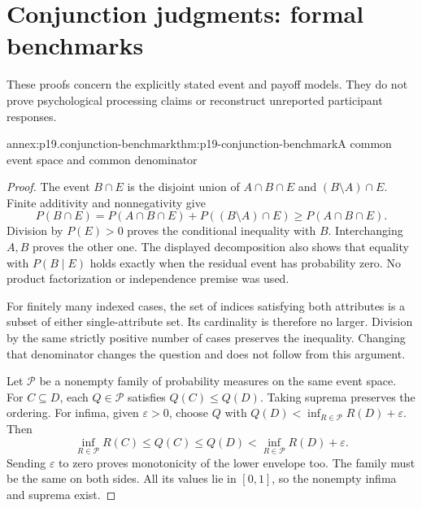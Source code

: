 \section{Conjunction judgments: formal benchmarks}
\label{sec:annex-p19-conjunction-judgments}

These proofs concern the explicitly stated event and payoff models.
They do not prove psychological processing claims or reconstruct
unreported participant responses.

\begin{annexitem}{annex:p19.conjunction-benchmark}{thm:p19-conjunction-benchmark}{A common event space and common denominator}
\begin{proof}
The event \(B\cap E\) is the disjoint union of
\(A\cap B\cap E\) and \((B\setminus A)\cap E\).
Finite additivity and nonnegativity give
\[
 P(B\cap E)=P(A\cap B\cap E)+P((B\setminus A)\cap E)
                         \geq P(A\cap B\cap E).
\]
Division by \(P(E)>0\) proves the conditional inequality
with \(B\). Interchanging \(A,B\) proves the other one.
The displayed decomposition also shows that equality
with \(P(B\mid E)\) holds exactly when the residual
event has probability zero. No product factorization
or independence premise was used.

For finitely many indexed cases, the set of indices
satisfying both attributes is a subset of either
single-attribute set. Its cardinality is therefore
no larger. Division by the same strictly positive
number of cases preserves the inequality. Changing
that denominator changes the question and does not
follow from this argument.

Let \(\mathcal P\) be a nonempty family of probability
measures on the same event space. For \(C\subseteq D\),
each \(Q\in\mathcal P\) satisfies \(Q(C)\leq Q(D)\).
Taking suprema preserves the ordering.
For infima, given \(\varepsilon>0\), choose \(Q\)
with \(Q(D)<\inf_{R\in\mathcal P}R(D)+\varepsilon\).
Then
\[
 \inf_{R\in\mathcal P}R(C)\leq Q(C)\leq Q(D)
                    <\inf_{R\in\mathcal P}R(D)+\varepsilon.
\]
Sending \(\varepsilon\) to zero proves monotonicity
of the lower envelope too. The family must be
the same on both sides. All its values lie in
\([0,1]\), so the nonempty infima and suprema exist.
\end{proof}
\end{annexitem}

